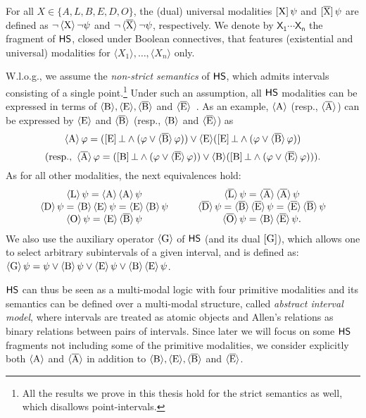 For all $X\in\{A,L,B,E,D,O\}$, the (dual) universal modalities $\hsXu\psi$ and $\hsXtu\psi$ are defined as $\neg\hsX\neg\psi$ and $\neg\hsXt\neg\psi$, respectively. 
We denote by $\mathsf{X_1\cdots X_n}$ the fragment of $\HS$, closed under Boolean connectives, that features (existential and universal) modalities for $\langle X_1\rangle,\ldots, \langle X_n\rangle $ only.

W.l.o.g., we assume the \emph{non-strict semantics} of $\HS$, which admits intervals consisting of a single point.\footnote{All the results we prove in this thesis hold for the strict semantics as well, which disallows point-intervals.} Under such an assumption, all $\HS$ modalities can be expressed in terms of
$\hsB, \hsE, \hsBt$ and $\hsEt$~\cite{HS91}.
As an example, $\hsA$ (resp., $\hsAt$) can be expressed by $\hsE$ and $\hsBt$ (resp., $\hsB$ and $\hsEt$) as 
\[\hsA \varphi= (\hsEu\bot \wedge (\varphi \vee \hsBt \varphi)) \vee \hsE (\hsEu\bot \wedge (\varphi \vee \hsBt \varphi))\] 
\[(\text{resp., } \hsAt \varphi= (\hsBu\bot \wedge (\varphi \vee \hsEt \varphi)) \vee \hsB (\hsBu\bot \wedge (\varphi \vee \hsEt \varphi))).\]
%
As for all other modalities, the next equivalences hold:
\begin{equation*}
\begin{array}{cc}
\hsL\psi=\hsA\hsA\psi & \qquad \hsLt\psi=\hsAt\hsAt\psi \\ 
\hsD\psi=\hsB\hsE\psi= \hsE\hsB\psi & \qquad \hsDt\psi=\hsBt\hsEt\psi =\hsEt\hsBt\psi \\ 
\hsO\psi=\hsE\hsBt\psi & \qquad \hsOt\psi=\hsB\hsEt\psi .
\end{array}
\end{equation*}
We also use the auxiliary operator $\hsG$ of $\HS$ (and its dual $\hsGu$), which allows one to select  arbitrary subintervals of a given interval, and is defined as: $\hsG\psi= \psi \vee \hsB\psi \vee \hsE\psi \vee \hsB\hsE\psi$.

$\HS$ can thus be seen as a multi-modal logic with   
four primitive modalities
and its semantics can be defined over a multi-modal structure, called \emph{abstract interval model}, where intervals are treated as atomic objects and Allen's relations as 
binary relations between pairs of intervals.
Since later we will focus on some $\HS$ fragments not including some of the primitive modalities, we consider explicitly both $\hsA$ and $\hsAt$ in addition to $\hsB, \hsE, \hsBt$ and $\hsEt$.

